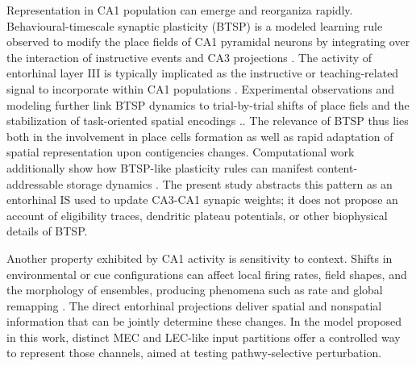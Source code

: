 Representation in CA1 population can emerge and reorganiza rapidly.
Behavioural-timescale synaptic plasticity (BTSP) is a modeled learning rule observed to modify the place fields of CA1 pyramidal neurons by integrating over the interaction of instructive events and CA3 projections \cite{bittner2017, milstein2021}.
The activity of entorhinal layer III is typically implicated as the instructive or teaching-related signal to incorporate within CA1 populations \cite{grienberger2022}.
Experimental observations and modeling further link BTSP dynamics to trial-by-trial shifts of place fiels and the stabilization of task-oriented spatial encodings \cite{madar2025, vaidya2025}..
The relevance of BTSP thus lies both in the involvement in place cells formation as well as rapid adaptation of spatial representation upon contigencies changes.
Computational work additionally show how BTSP-like plasticity rules can manifest content-addressable storage dynamics \cite{wu2025}.
The present study abstracts this pattern as an entorhinal IS used to update CA3-CA1 synapic weights; it does not propose an account of eligibility traces, dendritic plateau potentials, or other biophysical details of BTSP.

Another property exhibited by CA1 activity is sensitivity to context.
Shifts in environmental or cue configurations can affect local firing rates, field shapes, and the morphology of ensembles, producing phenomena such as rate and global remapping \cite{muller1987, leutgeb2005}.
The direct entorhinal projections deliver spatial and nonspatial information that can be jointly determine these changes.
In the model proposed in this work, distinct MEC and LEC-like input partitions offer a controlled way to represent those channels, aimed at testing pathwy-selective perturbation.

